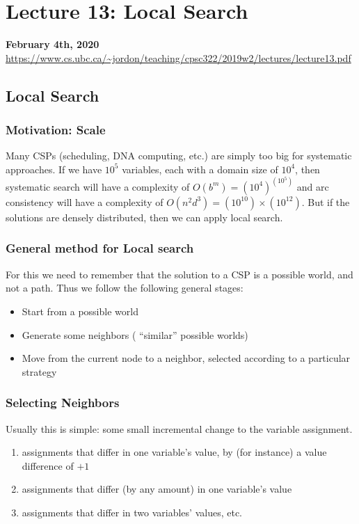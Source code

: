 \documentclass{article}
\def\red#1{{\color{red}#1}}
\begin{document}
\section*{Lecture 13: Local Search}
\textbf{February 4th, 2020} \\
\url{https://www.cs.ubc.ca/~jordon/teaching/cpsc322/2019w2/lectures/lecture13.pdf}
\subsection*{Local Search}
\begin{siderules}
\subsubsection*{Motivation: Scale}
Many CSPs (scheduling, DNA computing, etc.) are simply too big for systematic approaches. If we have $ 10^5 $ variables, each with a domain size of $ 10^4 $, then systematic search will have a complexity of $ O(b^m) = (10^4)^{(10^5)} $ and arc consistency will have a complexity of $ O(n^2d^3) = (10^{10}) \times (10^{12}) $. But if the solutions are densely distributed, then we can apply local search. 

\end{siderules}


\subsubsection*{General method for Local search}
For this we need to remember that the solution to a CSP is a possible world, and \red{not a path}. Thus we follow the following general stages:
\begin{itemize}
	\item Start from a possible world
	\item Generate some neighbors ( “similar” possible worlds)
	\item Move from the current node to a neighbor, selected according to a particular strategy
\end{itemize}


\subsubsection*{Selecting Neighbors}
Usually this is simple: some small incremental change to the variable assignment. 

\begin{enumerate}[label =(\alph*) ]
	\item assignments that differ in one variable's value, by (for instance) a value difference of $ +1 $
	\item assignments that differ (by any amount) in one variable's value
	\item assignments that differ in two variables' values, etc.
\end{enumerate}
\end{document}
